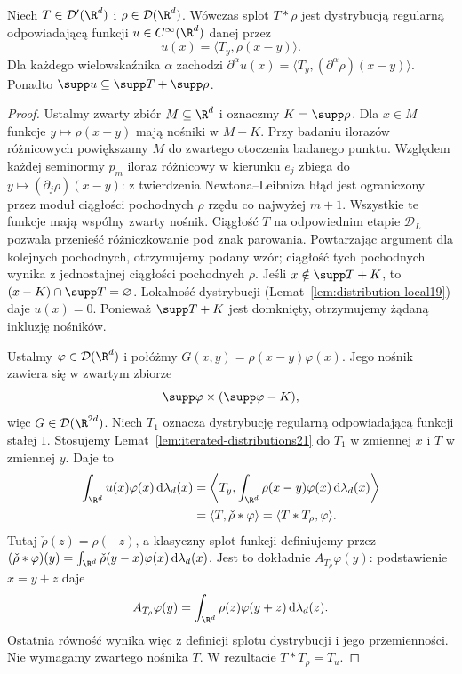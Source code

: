 \begin{twierdzenie}
\label{thm:smoothing21}
Niech $T\in\mathcal D'(\R^d)$ i
$\rho\in\mathcal D(\R^d)$. Wówczas splot
$T*\rho$ jest dystrybucją regularną odpowiadającą
funkcji $u\in C^\infty(\R^d)$ danej przez
\[
 u(x)=\langle T_y,\rho(x-y)\rangle.
\]
Dla każdego wielowskaźnika $\alpha$ zachodzi
$\partial^\alpha u(x)
=\langle T_y,(\partial^\alpha\rho)(x-y)\rangle$.
Ponadto $\supp u\subseteq\supp T+\supp\rho$.
\end{twierdzenie}
\begin{proof}
Ustalmy zwarty zbiór $M\subseteq\R^d$ i oznaczmy
$K=\supp\rho$. Dla $x\in M$ funkcje
$y\mapsto\rho(x-y)$ mają nośniki w $M-K$.
Przy badaniu ilorazów różnicowych powiększamy $M$
do zwartego otoczenia badanego punktu. Względem każdej
seminormy $p_m$ iloraz różnicowy w kierunku $e_j$
zbiega do $y\mapsto(\partial_j\rho)(x-y)$:
z twierdzenia Newtona--Leibniza błąd jest ograniczony
przez moduł ciągłości pochodnych $\rho$ rzędu co najwyżej
$m+1$. Wszystkie te funkcje mają wspólny zwarty nośnik.
Ciągłość $T$ na odpowiednim etapie $\mathcal D_L$
pozwala przenieść różniczkowanie pod znak parowania.
Powtarzając argument dla kolejnych pochodnych,
otrzymujemy podany wzór; ciągłość tych pochodnych
wynika z jednostajnej ciągłości pochodnych $\rho$.
Jeśli $x\notin\supp T+K$, to
$(x-K)\cap\supp T=\varnothing$. Lokalność dystrybucji
(Lemat~\ref{lem:distribution-local19}) daje $u(x)=0$.
Ponieważ $\supp T+K$ jest domknięty, otrzymujemy
żądaną inkluzję nośników.

Ustalmy $\varphi\in\mathcal D(\R^d)$ i połóżmy
$G(x,y)=\rho(x-y)\varphi(x)$. Jego nośnik zawiera się
w zwartym zbiorze
\[
 \supp\varphi\times(\supp\varphi-K),
\]
więc $G\in\mathcal D(\R^{2d})$.
Niech $T_1$ oznacza dystrybucję regularną odpowiadającą
funkcji stałej $1$. Stosujemy
Lemat~\ref{lem:iterated-distributions21} do $T_1$ w zmiennej
$x$ i $T$ w zmiennej $y$. Daje to
\[
 \begin{aligned}
 \int_{\R^d}u(x)\varphi(x)\,\mathrm d\lambda_d(x)
 &=\left\langle T_y,
      \int_{\R^d}\rho(x-y)\varphi(x)\,\mathrm d\lambda_d(x)
   \right\rangle\\
 &=\langle T,\check\rho*\varphi\rangle
 =\langle T* T_\rho,\varphi\rangle.
 \end{aligned}
\]
Tutaj $\check\rho(z)=\rho(-z)$, a klasyczny splot
funkcji definiujemy przez
$(\check\rho*\varphi)(y)=\int_{\R^d}\check\rho(y-x)
\varphi(x)\,\mathrm d\lambda_d(x)$.
Jest to dokładnie $A_{T_\rho}\varphi(y)$: podstawienie
$x=y+z$ daje
\[
 A_{T_\rho}\varphi(y)=
 \int_{\R^d}\rho(z)\varphi(y+z)\,\mathrm d\lambda_d(z).
\]
Ostatnia równość wynika więc z definicji splotu
dystrybucji i jego przemienności. Nie wymagamy
zwartego nośnika $T$. W rezultacie $T*T_\rho=T_u$.
\end{proof}

